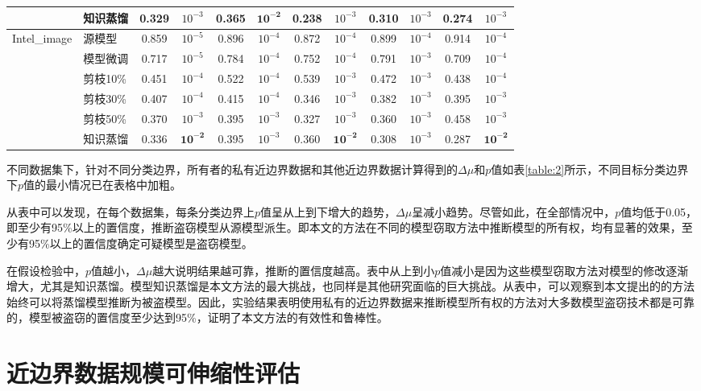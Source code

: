 \begin{table}[h]
{\begin{tabular}{l l c c c c c c c c c c}
								&知识蒸馏  & 0.329 & $10^{-3}$ & 0.365 & $\pmb{10^{-2}}$ & 0.238 & $10^{-3}$ & 0.310 & $10^{-3}$ & 0.274 & $10^{-3}$   \\
		\hline
\multirow{6}{5em}{Intel\_image} &源模型    & 0.859 & $10^{-5}$ & 0.896 & $10^{-4}$ & 0.872 & $10^{-4}$ & 0.899 & $10^{-4}$ & 0.914 & $10^{-4}$   \\
								&模型微调  & 0.717 & $10^{-5}$ & 0.784 & $10^{-4}$ & 0.752 & $10^{-4}$ & 0.791 & $10^{-3}$ & 0.709 & $10^{-4}$   \\
								&剪枝10\%  & 0.451 & $10^{-4}$ & 0.522 & $10^{-4}$ & 0.539 & $10^{-3}$ & 0.472 & $10^{-3}$ & 0.438 & $10^{-4}$   \\
								&剪枝30\%  & 0.407 & $10^{-4}$ & 0.415 & $10^{-4}$ & 0.346 & $10^{-3}$ & 0.382 & $10^{-3}$ & 0.395 & $10^{-3}$   \\
								&剪枝50\%  & 0.370 & $10^{-3}$ & 0.395 & $10^{-3}$ & 0.327 & $10^{-3}$ & 0.360 & $10^{-3}$ & 0.458 & $10^{-3}$   \\
								&知识蒸馏  & 0.336 & $\pmb{10^{-2}}$ & 0.395 & $10^{-3}$ & 0.360 & $\pmb{10^{-2}}$ & 0.308 & $10^{-3}$ & 0.287 & $\pmb{10^{-2}}$   \\
		\bottomrule[1pt]		
	\end{tabular}
}
\end{table}

不同数据集下，针对不同分类边界，所有者的私有近边界数据和其他近边界数据计算得到的$\Delta\mu$和$p$值如表\ref{table:2}所示，不同目标分类边界下$p$值的最小情况已在表格中加粗。

从表中可以发现，在每个数据集，每条分类边界上$p$值呈从上到下增大的趋势，$\Delta\mu$呈减小趋势。尽管如此，在全部情况中，$p$值均低于0.05，即至少有95\%以上的置信度，推断盗窃模型从源模型派生。即本文的方法在不同的模型窃取方法中推断模型的所有权，均有显著的效果，至少有95\%以上的置信度确定可疑模型是盗窃模型。

在假设检验中，$p$值越小，$\Delta\mu$越大说明结果越可靠，推断的置信度越高。表中从上到小$p$值减小是因为这些模型窃取方法对模型的修改逐渐增大，尤其是知识蒸馏。模型知识蒸馏是本文方法的最大挑战，也同样是其他研究面临的巨大挑战。从表中，可以观察到本文提出的的方法始终可以将蒸馏模型推断为被盗模型。因此，实验结果表明使用私有的近边界数据来推断模型所有权的方法对大多数模型盗窃技术都是可靠的，模型被盗窃的置信度至少达到95\%，证明了本文方法的有效性和鲁棒性。


\section{近边界数据规模可伸缩性评估}\label{5.7}

